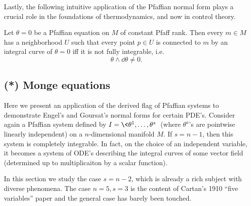 Lastly, the following intuitive application of the Pfaffian normal form plays a crucial role in the foundations of thermodynamics, and now in control theory.

\begin{thm}[Caratheodory]
    Let $\theta=0$ be a Pfaffian equation on $M$ of constant Pfaff rank. Then every $m\in M$ has a neighborhood $U$ such that every point $p\in U$ is connected to $m$ by an integral curve of $\theta=0$ iff it is not fully integrable, i.e.\
    \[\theta\wedge\dd\theta\neq 0.\]
\end{thm}






\subsection{(*) Monge equations}

Here we present an application of the derived flag of Pfaffian systems to demonstrate Engel's and Goursat's normal forms for certain PDE's. Consider again a Pfaffian system defined by $I=\<\theta^1,\ldots,\theta^s\>$ (where $\theta^a$'s are pointwise linearly independent) on a $n$-dimensional manifold $M$. If $s=n-1$, then this system is completely integrable. In fact, on the choice of an independent variable, it becomes a system of ODE's describing the integral curves of some vector field (determined up to multiplicaiton by a scalar function).

In this section we study the case $s=n-2$, which is already a rich subject with diverse phenomena. The case $n=5,s=3$ is the content of Cartan's 1910 ``five variables'' paper and the general case has barely been touched.

